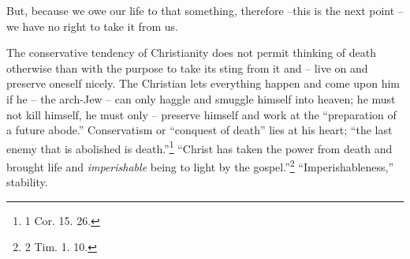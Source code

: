 \documentclass[12pt,a4paper]{book}
\begin{document}
But, because we owe our life to that something, therefore --this is the next 
point -- we have no right to take it from us.

The conservative tendency of Christianity does not permit thinking of death 
otherwise than with the purpose to take its sting from it and -- live on and 
preserve oneself nicely. The Christian lets everything happen and come upon 
him if he -- the arch-Jew -- can only haggle and smuggle himself into heaven; 
he must not kill himself, he must only -- preserve himself and work at the 
``preparation of a future abode.'' Conservatism or ``conquest of death'' 
lies at his heart; ``the last enemy that is abolished is death.''\footnote{1 
Cor. 15. 26.} ``Christ has taken the power from death and brought life and 
\textit{imperishable} being to light by the gospel.''\footnote{2 Tim. 1. 10.} 
``Imperishableness,'' stability.
\end{document}
